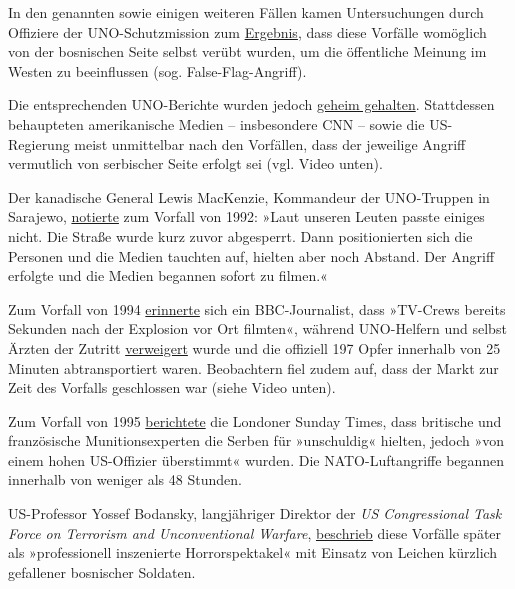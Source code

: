 In den genannten sowie einigen weiteren Fällen kamen Untersuchungen
durch Offiziere der UNO-Schutz­mission zum
\href{https://swprs.files.wordpress.com/2019/12/anatomy-of-a-massacre_david-binder_foreign-policy_1994.pdf}{Ergebnis},
dass diese Vorfälle womöglich von der bosnischen Seite selbst verübt
wurden, um die öffentliche Meinung im Westen zu beeinflussen (sog.
False-Flag-Angriff).

Die entsprechenden UNO-Berichte wurden jedoch
\href{https://swprs.files.wordpress.com/2019/12/dpa_un-report-sarajevo_1996.pdf}{geheim
gehalten}. Stattdessen behaupteten amerikanische Medien -- insbesondere
CNN -- sowie die US-Regierung meist unmittelbar nach den Vorfällen, dass
der jeweilige Angriff vermutlich von serbischer Seite erfolgt sei (vgl.
Video unten).

Der kanadische General Lewis MacKenzie, Kommandeur der UNO-Truppen in
Sarajewo,
\href{https://archive.org/details/peacekeeperroadt0000mack/page/194}{notierte}
zum Vorfall von 1992: »Laut unseren Leuten passte einiges nicht. Die
Straße wurde kurz zuvor abgesperrt. Dann positionierten sich die
Personen und die Medien tauchten auf, hielten aber noch Abstand. Der
Angriff erfolgte und die Medien begannen sofort zu filmen.«

Zum Vorfall von 1994
\href{http://news.bbc.co.uk/2/hi/europe/3459965.stm}{erinnerte} sich ein
BBC-Journalist, dass »TV-Crews bereits Sekunden nach der Explosion vor
Ort filmten«, während UNO-Helfern und selbst Ärzten der Zutritt
\href{https://swprs.files.wordpress.com/2019/12/dpa_un-report-sarajevo_1996.pdf}{verweigert}
wurde und die offiziell 197 Opfer innerhalb von 25 Minuten
abtransportiert waren. Beobachtern fiel zudem auf, dass der Markt zur
Zeit des Vorfalls geschlossen war (siehe Video unten).

Zum Vorfall von 1995
\href{https://swprs.files.wordpress.com/2019/12/sunday-times_serbs-not-guilty-of-massacre_1995.pdf}{berichtete}
die Londoner Sunday Times, dass britische und französische
Munitions­experten die Serben für »unschuldig« hielten, jedoch »von
einem hohen US-Offizier überstimmt« wurden. Die NATO-Luftangriffe
begannen innerhalb von weniger als 48 Stunden.

US-Professor Yossef Bodansky, langjähriger Direktor der \emph{US
Congressional Task Force on Terrorism and Unconventional Warfare},
\href{https://swprs.files.wordpress.com/2019/12/bodansky_offensive-in-the-balkans_1995.pdf\#page=40}{beschrieb}
diese Vorfälle später als »professionell inszenierte Horror­spektakel«
mit Einsatz von Leichen kürzlich gefallener bosnischer Soldaten.

